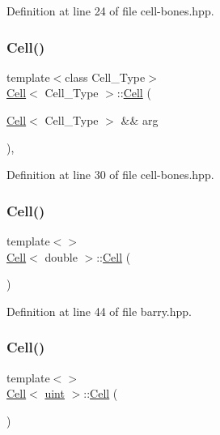 Definition at line 24 of file cell-\/bones.\+hpp.

\mbox{\label{class_cell_ad6a47fdac801426e94328239890394fe}} 
\subsubsection{\texorpdfstring{Cell()}{Cell()}\hspace{0.1cm}{\footnotesize\ttfamily [4/12]}}
{\footnotesize\ttfamily template$<$class Cell\+\_\+\+Type$>$ \\
\hyperlink{class_cell}{Cell}$<$ Cell\+\_\+\+Type $>$\+::\hyperlink{class_cell}{Cell} (\begin{DoxyParamCaption}\item[{\hyperlink{class_cell}{Cell}$<$ Cell\+\_\+\+Type $>$ \&\&}]{arg }\end{DoxyParamCaption})\hspace{0.3cm}{\ttfamily [inline]}, {\ttfamily [noexcept]}}



Definition at line 30 of file cell-\/bones.\+hpp.

\mbox{\label{class_cell_a5ecdaddaf4661a9a8fe6f0ed61595847}} 
\subsubsection{\texorpdfstring{Cell()}{Cell()}\hspace{0.1cm}{\footnotesize\ttfamily [5/12]}}
{\footnotesize\ttfamily template$<$$>$ \\
\hyperlink{class_cell}{Cell}$<$ double $>$\+::\hyperlink{class_cell}{Cell} (\begin{DoxyParamCaption}{ }\end{DoxyParamCaption})\hspace{0.3cm}{\ttfamily [inline]}}



Definition at line 44 of file barry.\+hpp.

\mbox{\label{class_cell_aa102374546b7479f50a8eeec80ec2764}} 
\subsubsection{\texorpdfstring{Cell()}{Cell()}\hspace{0.1cm}{\footnotesize\ttfamily [6/12]}}
{\footnotesize\ttfamily template$<$$>$ \\
\hyperlink{class_cell}{Cell}$<$ \hyperlink{typedefs_8hpp_a91ad9478d81a7aaf2593e8d9c3d06a14}{uint} $>$\+::\hyperlink{class_cell}{Cell} (\begin{DoxyParamCaption}{ }\end{DoxyParamCaption})\hspace{0.3cm}{\ttfamily [inline]}}



